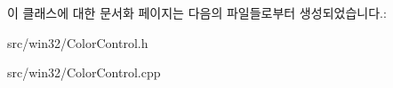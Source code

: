 이 클래스에 대한 문서화 페이지는 다음의 파일들로부터 생성되었습니다.\+:\begin{DoxyCompactItemize}
\item 
src/win32/Color\+Control.\+h\item 
src/win32/Color\+Control.\+cpp\end{DoxyCompactItemize}
